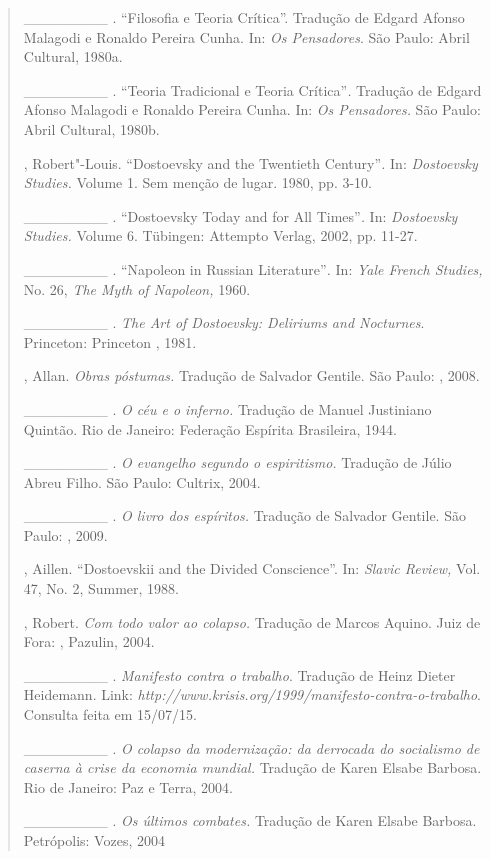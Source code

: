 {\begin{quote}
\begin{Parskip}
\_\_\_\_\_\_\_\_ . ``Filosofia e Teoria Crítica''. Tradução de Edgard
Afonso Malagodi e Ronaldo Pereira Cunha. In: \emph{Os Pensadores}. São
Paulo: Abril Cultural, 1980a.

\_\_\_\_\_\_\_\_ . ``Teoria Tradicional e Teoria Crítica''\emph{.}
Tradução de Edgard Afonso Malagodi e Ronaldo Pereira Cunha. In: \emph{Os
Pensadores.} São Paulo: Abril Cultural, 1980b.

, Robert"-Louis. ``Dostoevsky and the Twentieth Century''\emph{.}
In: \emph{Dostoevsky Studies.} Volume 1. Sem menção de lugar. 1980, pp.
3-10.

\_\_\_\_\_\_\_\_ . ``Dostoevsky Today and for All Times''\emph{.} In:
\emph{Dostoevsky Studies.} Volume 6. Tübingen: Attempto Verlag, 2002,
pp. 11-27.

\_\_\_\_\_\_\_\_ . ``Napoleon in Russian Literature''\emph{.} In:
\emph{Yale French Studies,} No. 26, \emph{The Myth of Napoleon,} 1960.

\_\_\_\_\_\_\_\_ . \emph{The Art of Dostoevsky: Deliriums and
Nocturnes}. Princeton: Princeton , 1981.

, Allan. \emph{Obras póstumas.} Tradução de Salvador Gentile. São
Paulo: , 2008.

\_\_\_\_\_\_\_\_ . \emph{O céu e o inferno.} Tradução de Manuel
Justiniano Quintão. Rio de Janeiro: Federação Espírita Brasileira, 1944.

\_\_\_\_\_\_\_\_ . \emph{O evangelho segundo o espiritismo.} Tradução de
Júlio Abreu Filho. São Paulo: Cultrix, 2004.

\_\_\_\_\_\_\_\_ . \emph{O livro dos espíritos.} Tradução de Salvador
Gentile. São Paulo: , 2009.

, Aillen. ``Dostoevskii and the Divided Conscience''. In:
\emph{Slavic Review,} Vol. 47, No. 2, Summer, 1988.

, Robert. \emph{Com todo valor ao colapso.} Tradução de Marcos
Aquino. Juiz de Fora: , Pazulin, 2004.

\_\_\_\_\_\_\_\_ . \emph{Manifesto contra o trabalho}. Tradução de Heinz
Dieter Heidemann. Link:
\emph{http://www.krisis.org/1999/manifesto-contra-o-trabalho}.
Consulta feita em 15/07/15.

\_\_\_\_\_\_\_\_ . \emph{O colapso da modernização: da derrocada do
socialismo de caserna à crise da economia mundial.} Tradução de Karen
Elsabe Barbosa. Rio de Janeiro: Paz e Terra, 2004.

\_\_\_\_\_\_\_\_ . \emph{Os últimos combates.} Tradução de Karen Elsabe
Barbosa. Petrópolis: Vozes, 2004


\end{Parskip}
\end{quote}}
